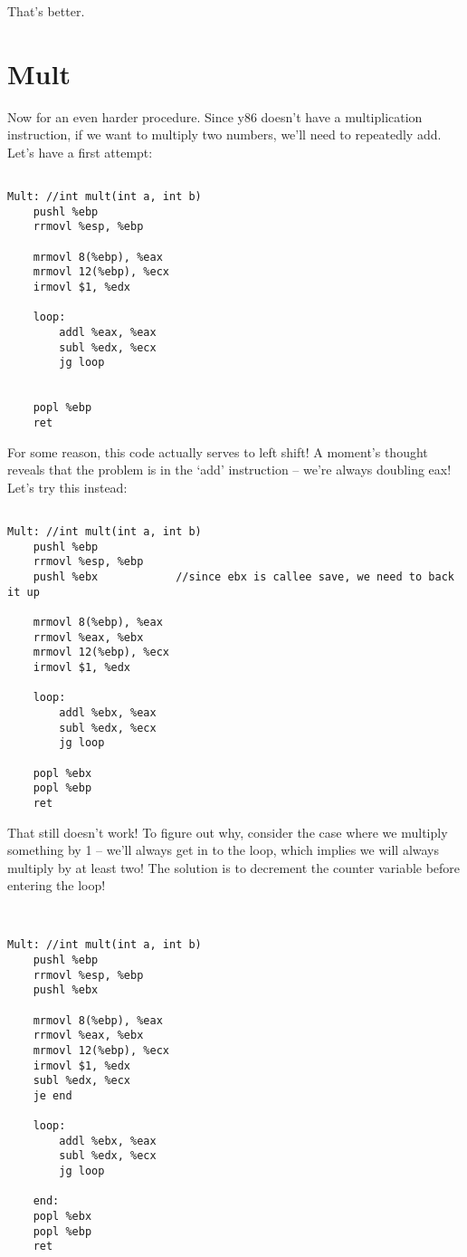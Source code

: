 \documentclass[10pt]{article}
\begin{document}
That's better.

\section{Mult}

Now for an even harder procedure. Since y86 doesn't have a multiplication instruction, if we want to multiply two numbers, we'll need to repeatedly add. Let's have a first attempt:

\begin{lstlisting}

Mult: //int mult(int a, int b)
    pushl %ebp
    rrmovl %esp, %ebp
    
    mrmovl 8(%ebp), %eax
    mrmovl 12(%ebp), %ecx
    irmovl $1, %edx
    
    loop:
        addl %eax, %eax
        subl %edx, %ecx
        jg loop
    
    
    popl %ebp
    ret

\end{lstlisting}

For some reason, this code actually serves to left shift! A moment's thought reveals that the problem is in the `add' instruction -- we're always doubling eax! Let's try this instead:

\begin{lstlisting}

Mult: //int mult(int a, int b)
    pushl %ebp
    rrmovl %esp, %ebp
    pushl %ebx            //since ebx is callee save, we need to back it up
    
    mrmovl 8(%ebp), %eax
    rrmovl %eax, %ebx
    mrmovl 12(%ebp), %ecx
    irmovl $1, %edx
    
    loop:
        addl %ebx, %eax
        subl %edx, %ecx
        jg loop
    
    popl %ebx
    popl %ebp
    ret

\end{lstlisting}

That still doesn't work! To figure out why, consider the case where we multiply something by 1 -- we'll always get in to the loop, which implies we will always multiply by at least two! The solution is to decrement the counter variable before entering the loop!


\begin{lstlisting}

    
Mult: //int mult(int a, int b)
    pushl %ebp
    rrmovl %esp, %ebp
    pushl %ebx
    
    mrmovl 8(%ebp), %eax
    rrmovl %eax, %ebx
    mrmovl 12(%ebp), %ecx
    irmovl $1, %edx
    subl %edx, %ecx
    je end
    
    loop:
        addl %ebx, %eax
        subl %edx, %ecx
        jg loop
    
    end:
    popl %ebx
    popl %ebp
    ret

\end{lstlisting}
\end{document}
